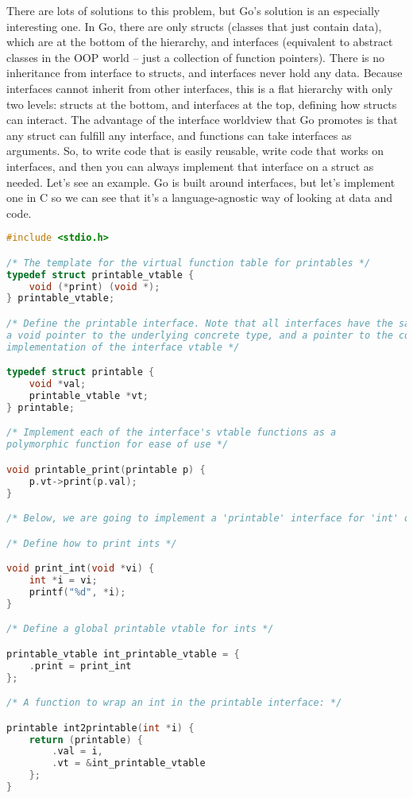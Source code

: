 \documentclass[12pt]{article}
\begin{document}
There are lots of solutions to this problem, but Go's solution is an especially
interesting one.  In Go, there are only structs (classes that just contain
data), which are at the bottom of the hierarchy, and interfaces (equivalent to
abstract classes in the OOP world -- just a collection of function pointers).
There is no inheritance from interface to structs, and interfaces never hold
any data. Because interfaces cannot inherit from other interfaces, this is a
flat hierarchy with only two levels: structs at the bottom, and interfaces at
the top, defining how structs can interact.  The advantage of the interface
worldview that Go promotes is that any struct can fulfill any interface, and
functions can take interfaces as arguments. So, to write code that is easily
reusable, write code that works on interfaces, and then you can always
implement that interface on a struct as needed. Let's see an example. Go is
built around interfaces, but let's implement one in C so we can see that it's a
language-agnostic way of looking at data and code.

\begin{lstlisting}[language=C]
#include <stdio.h>

/* The template for the virtual function table for printables */
typedef struct printable_vtable {
    void (*print) (void *);
} printable_vtable;

/* Define the printable interface. Note that all interfaces have the same structure:
a void pointer to the underlying concrete type, and a pointer to the concrete type's
implementation of the interface vtable */

typedef struct printable {
    void *val;
    printable_vtable *vt;
} printable;

/* Implement each of the interface's vtable functions as a
polymorphic function for ease of use */

void printable_print(printable p) {
    p.vt->print(p.val);
}

/* Below, we are going to implement a 'printable' interface for 'int' objects */

/* Define how to print ints */

void print_int(void *vi) {
    int *i = vi;
    printf("%d", *i);
}

/* Define a global printable vtable for ints */

printable_vtable int_printable_vtable = {
    .print = print_int
};

/* A function to wrap an int in the printable interface: */

printable int2printable(int *i) {
    return (printable) {
        .val = i,
        .vt = &int_printable_vtable
    };
}
\end{lstlisting}
\end{document}
